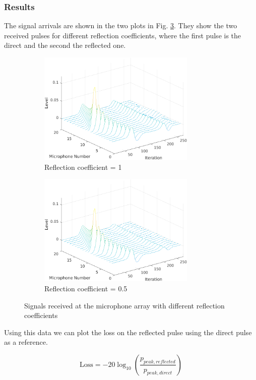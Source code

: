 \documentclass[twocolumn]{article}
\begin{document}
\subsubsection{Results}
The signal arrivals are shown in the two plots in Fig. \ref{fig_3_2_3d}.
They show the two received pulses for different reflection coefficients, where
the first pulse is the direct and the second the reflected one.

\begin{figure}[H]
    \begin{subfigure}[]{75mm}
        \centering
        \includegraphics[width=75mm]{./Images/3_2_r_1_3D.png}
        \caption{Reflection coefficient = 1}
        \label{fig_3_2_3d_r_1}
    \end{subfigure}
    \begin{subfigure}[]{75mm}
        \centering
        \includegraphics[width=75mm]{./Images/3_2_r_0.5_3D.png}
        \caption{Reflection coefficient = 0.5}
        \label{fig_3_2_3d_r_05}
    \end{subfigure}
    \caption{Signals received at the microphone array with different reflection coefficients}
    \label{fig_3_2_3d}
\end{figure}

Using this data we can plot the loss on the reflected pulse using the direct pulse as a
reference.

\begin{equation}
    \text{Loss} = -20\log_{10}\left(\frac{p_{peak,reflected}}{p_{peak,direct}}\right)
\end{equation}
\end{document}
